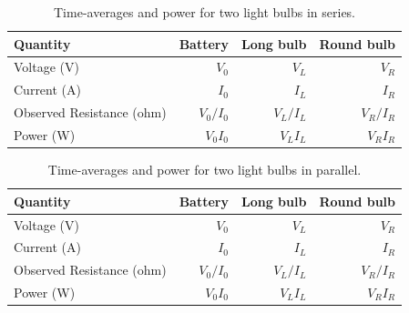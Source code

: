 %
\begin{table}[ht]
	\begin{center}
		\begin{tabular}{l|r|r|r}
            \textbf{Quantity} & \textbf{Battery} & \textbf{Long bulb} & \textbf{Round bulb} \\
            \hline
            Voltage (V) & $V_{0}$ & $V_{L}$ & $V_{R}$ \\
            Current (A) & $I_{0}$ & $I_{L}$ & $I_{R}$ \\
            \hline
            Observed Resistance (ohm) & $V_{0} / I_{0}$ & $V_{L} / I_{L}$ & $V_{R} / I_{R}$ \\
            Power (W) & $V_{0} I_{0}$ & $V_{L} I_{L}$ & $V_{R} I_{R}$ \\
            \hline
        \end{tabular}
	\end{center}
	\caption{Time-averages and power for two light bulbs in series.}
	\label{table.03.bulbs.series}
\end{table}
%
\begin{table}[ht]
	\begin{center}
		\begin{tabular}{l|r|r|r}
            \textbf{Quantity} & \textbf{Battery} & \textbf{Long bulb} & \textbf{Round bulb} \\
            \hline
            Voltage (V) & $V_{0}$ & $V_{L}$ & $V_{R}$ \\
            Current (A) & $I_{0}$ & $I_{L}$ & $I_{R}$ \\
            \hline
            Observed Resistance (ohm) & $V_{0} / I_{0}$ & $V_{L} / I_{L}$ & $V_{R} / I_{R}$ \\
            Power (W) & $V_{0} I_{0}$ & $V_{L} I_{L}$ & $V_{R} I_{R}$ \\
            \hline
        \end{tabular}
	\end{center}
	\caption{Time-averages and power for two light bulbs in parallel.}
	\label{table.03.bulbs.parallel}
\end{table}
%
